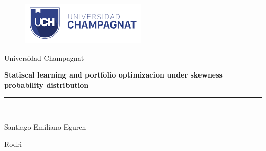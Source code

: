 \documentclass[12pt]{article}
\begin{document}



\begin{titlepage}

\begin{center}
\vspace*{-1in}
\begin{figure}[htb]
\begin{center}
\includegraphics[width=6cm]{index}
\end{center}
\end{figure}








Universidad Champagnat\\
\vspace*{0.15in}




\begin{Large}
\textbf{Statiscal learning and portfolio optimizacion under skewness probability distribution } \\
\end{Large}
\vspace*{0.3in}



\rule{80mm}{0.1mm}\\
\vspace*{0.1in}


\begin{large}
Santiago Emiliano Eguren
\end{large}
\vspace*{0.3in}




\begin{large}
Rodri\\
\end{large}
\vspace*{0.3in}




\end{center}
\end{titlepage}
\end{document}
